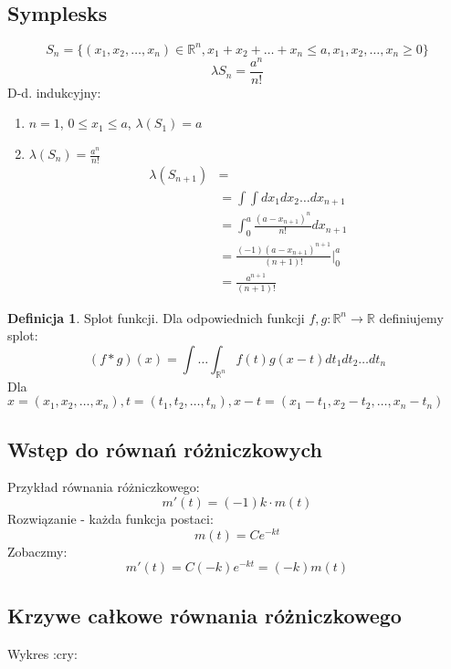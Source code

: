 \documentclass{article}
\theoremstyle{definition}
\newtheorem{de}{Definicja}[subsection]
\theoremstyle{definition}
\theoremstyle{definition}
\theoremstyle{definition}
\begin{document}
\subsection{Symplesks}

\[S_n=\{(x_1,x_2,\dots,x_n)\in\mathbb{R}^n, x_1+x_2+\dots+x_n\leq a, x_1,x_2,\dots,x_n\geq 0\}\]
\[\lambda{S_n}=\frac{a^n}{n!}\]
D-d. indukcyjny:
\begin{enumerate}
    \item $n=1$, $0\leq x_1\leq a$, $\lambda(S_1)=a$ 
    \item $\lambda(S_n)=\frac{a^n}{n!}$
    \begin{align}
        \lambda(S_{n+1})&=\\
        &= \int\int dx_1 dx_2\dots dx_{n+1}\\
        &= \int_{0}^{a} \frac{(a-x_{n+1})^n}{n!} dx_{n+1}\\
        &= \frac{(-1)(a-x_{n+1})^{n+1}}{(n+1)!}|_{0}^{a}\\
        &= \frac{a^{n+1}}{(n+1)!}
    \end{align}
\end{enumerate}

\begin{de}
    Splot funkcji. Dla odpowiednich funkcji $f,g:\mathbb{R}^n\rightarrow \mathbb{R}$
    definiujemy splot:
    \[(f*g)(x) = \int\dots\int_{\mathbb{R}^n} f(t)g(x-t) dt_1 dt_2 \dots dt_n\]
    Dla $x=(x_1,x_2,\dots,x_n), t=(t_1,t_2,\dots,t_n), x-t=(x_1-t_1,x_2-t_2,\dots,x_n-t_n)$
\end{de}

\subsection{Wstęp do równań różniczkowych}

Przykład równania różniczkowego:
\[m'(t)=(-1)k \cdot m(t)\]
Rozwiązanie - każda funkcja postaci:
\[m(t)=Ce^{-kt}\]
Zobaczmy:
\[m'(t)=C (-k) e^{-kt} = (-k) m(t)\]

\subsection{Krzywe całkowe równania różniczkowego}

Wykres :cry:
\end{document}
